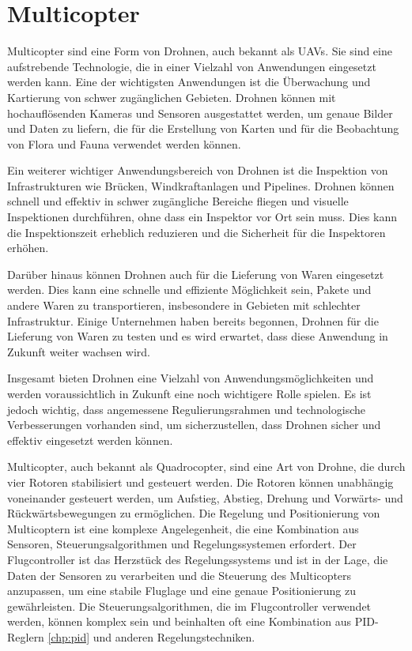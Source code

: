 \section{Multicopter} \label{drohne:section}



Multicopter sind eine Form von Drohnen, auch bekannt als \ac{UAV}s. Sie sind eine aufstrebende Technologie, die in einer Vielzahl von Anwendungen eingesetzt werden kann. Eine der wichtigsten Anwendungen ist die Überwachung und Kartierung von schwer zugänglichen Gebieten. Drohnen können mit hochauflösenden Kameras und Sensoren ausgestattet werden, um genaue Bilder und Daten zu liefern, die für die Erstellung von Karten und für die Beobachtung von Flora und Fauna verwendet werden können.

Ein weiterer wichtiger Anwendungsbereich von Drohnen ist die Inspektion von Infrastrukturen wie Brücken, Windkraftanlagen und Pipelines. Drohnen können schnell und effektiv in schwer zugängliche Bereiche fliegen und visuelle Inspektionen durchführen, ohne dass ein Inspektor vor Ort sein muss. Dies kann die Inspektionszeit erheblich reduzieren und die Sicherheit für die Inspektoren erhöhen.

Darüber hinaus können Drohnen auch für die Lieferung von Waren eingesetzt werden. Dies kann eine schnelle und effiziente Möglichkeit sein, Pakete und andere Waren zu transportieren, insbesondere in Gebieten mit schlechter Infrastruktur. Einige Unternehmen haben bereits begonnen, Drohnen für die Lieferung von Waren zu testen und es wird erwartet, dass diese Anwendung in Zukunft weiter wachsen wird.

Insgesamt bieten Drohnen eine Vielzahl von Anwendungsmöglichkeiten und werden voraussichtlich in Zukunft eine noch wichtigere Rolle spielen. Es ist jedoch wichtig, dass angemessene Regulierungsrahmen und technologische Verbesserungen vorhanden sind, um sicherzustellen, dass Drohnen sicher und effektiv eingesetzt werden können.

Multicopter, auch bekannt als Quadrocopter, sind eine Art von Drohne, die durch vier Rotoren stabilisiert und gesteuert werden. Die Rotoren können unabhängig voneinander gesteuert werden, um Aufstieg, Abstieg, Drehung und Vorwärts- und Rückwärtsbewegungen zu ermöglichen. Die Regelung und Positionierung von Multicoptern ist eine komplexe Angelegenheit, die eine Kombination aus Sensoren, Steuerungsalgorithmen und Regelungssystemen erfordert. 
Der Flugcontroller ist das Herzstück des Regelungssystems und ist in der Lage, die Daten der Sensoren zu verarbeiten und die Steuerung des Multicopters anzupassen, um eine stabile Fluglage und eine genaue Positionierung zu gewährleisten. Die Steuerungsalgorithmen, die im Flugcontroller verwendet werden, können komplex sein und beinhalten oft eine Kombination aus \ac{PID}-Reglern \ref{chp:pid} und anderen Regelungstechniken.

